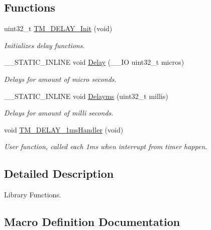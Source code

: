 \subsection*{Functions}
\begin{DoxyCompactItemize}
\item 
uint32\+\_\+t \hyperlink{group___t_m___d_e_l_a_y___functions_ga4ef7d542ba00287843b9e8575be8ecbc}{T\+M\+\_\+\+D\+E\+L\+A\+Y\+\_\+\+Init} (void)
\begin{DoxyCompactList}\small\item\em Initializes delay functions. \end{DoxyCompactList}\item 
\+\_\+\+\_\+\+S\+T\+A\+T\+I\+C\+\_\+\+I\+N\+L\+I\+NE void \hyperlink{group___t_m___d_e_l_a_y___functions_gae88c9bdf0f377e67efc2c200dc04ab89}{Delay} (\+\_\+\+\_\+\+IO uint32\+\_\+t micros)
\begin{DoxyCompactList}\small\item\em Delays for amount of micro seconds. \end{DoxyCompactList}\item 
\+\_\+\+\_\+\+S\+T\+A\+T\+I\+C\+\_\+\+I\+N\+L\+I\+NE void \hyperlink{group___t_m___d_e_l_a_y___functions_gab5d59e0b5fa9b331871d7fdd5bbad903}{Delayms} (uint32\+\_\+t millis)
\begin{DoxyCompactList}\small\item\em Delays for amount of milli seconds. \end{DoxyCompactList}\item 
void \hyperlink{group___t_m___d_e_l_a_y___functions_gadb034c7ca23c2f3f8a3a1a84004860b1}{T\+M\+\_\+\+D\+E\+L\+A\+Y\+\_\+1ms\+Handler} (void)
\begin{DoxyCompactList}\small\item\em User function, called each 1ms when interrupt from timer happen. \end{DoxyCompactList}\end{DoxyCompactItemize}


\subsection{Detailed Description}
Library Functions. 



\subsection{Macro Definition Documentation}
\mbox{\label{group___t_m___d_e_l_a_y___functions_ga72caa68e7ce61cb2dcb4ed9e219f58ce}} 
